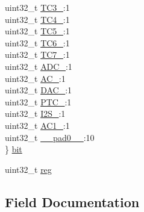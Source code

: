 \begin{DoxyCompactItemize}
\begin{tabbing}
\>uint32\_t \mbox{\hyperlink{union_p_m___a_p_b_c_m_a_s_k___type_a83f891cea5394d213968ba3850ab3241}{TC3\_}}:1\\
\>uint32\_t \mbox{\hyperlink{union_p_m___a_p_b_c_m_a_s_k___type_a6b5b1d2d731fafc45f9396cb41b8c4f5}{TC4\_}}:1\\
\>uint32\_t \mbox{\hyperlink{union_p_m___a_p_b_c_m_a_s_k___type_aeeceb5bef2a8ae787b6a157bf787c106}{TC5\_}}:1\\
\>uint32\_t \mbox{\hyperlink{union_p_m___a_p_b_c_m_a_s_k___type_a396a12b52ef1f90ebee4120f3889e0f3}{TC6\_}}:1\\
\>uint32\_t \mbox{\hyperlink{union_p_m___a_p_b_c_m_a_s_k___type_ab52ab4d9e2c6132f87f3b80e51e52fce}{TC7\_}}:1\\
\>uint32\_t \mbox{\hyperlink{union_p_m___a_p_b_c_m_a_s_k___type_a33c36a1eeac0f6b9f241851937e55073}{ADC\_}}:1\\
\>uint32\_t \mbox{\hyperlink{union_p_m___a_p_b_c_m_a_s_k___type_a199d422c0272cd97381a6a4d29c48d5c}{AC\_}}:1\\
\>uint32\_t \mbox{\hyperlink{union_p_m___a_p_b_c_m_a_s_k___type_a52351e765d73b0f5b9f06b5887e451af}{DAC\_}}:1\\
\>uint32\_t \mbox{\hyperlink{union_p_m___a_p_b_c_m_a_s_k___type_a73bc38d2352e61cf3cf0222b88fab621}{PTC\_}}:1\\
\>uint32\_t \mbox{\hyperlink{union_p_m___a_p_b_c_m_a_s_k___type_a32016ec93dd1ab818e71706c019fa2a4}{I2S\_}}:1\\
\>uint32\_t \mbox{\hyperlink{union_p_m___a_p_b_c_m_a_s_k___type_abbe220fbf6dc128dbdd79f441e0bb472}{AC1\_}}:1\\
\>uint32\_t \mbox{\hyperlink{union_p_m___a_p_b_c_m_a_s_k___type_a3e57c2ef1c3ffb36722f000cc1156824}{\_\_pad0\_\_}}:10\\
\} \mbox{\hyperlink{union_p_m___a_p_b_c_m_a_s_k___type_af2c91922f9fba7594360a5d1a1f7295b}{bit}}\\

\end{tabbing}\item 
uint32\+\_\+t \mbox{\hyperlink{union_p_m___a_p_b_c_m_a_s_k___type_a6b91636401516a477989a336376d7b40}{reg}}
\end{DoxyCompactItemize}


\subsection{Field Documentation}
\mbox{\label{union_p_m___a_p_b_c_m_a_s_k___type_a3e57c2ef1c3ffb36722f000cc1156824}} 
